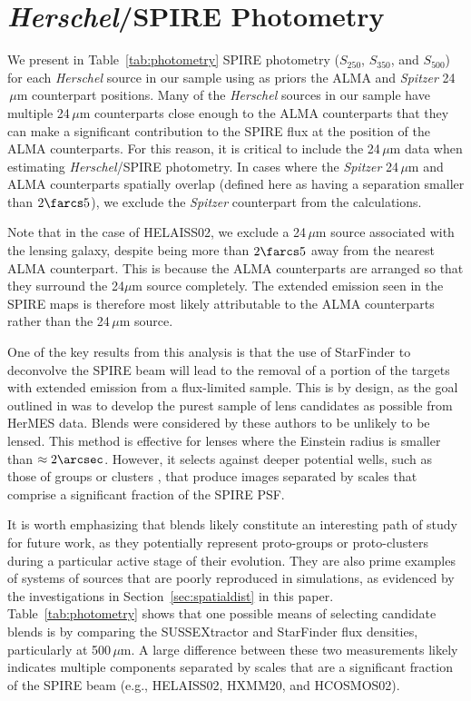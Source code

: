 \documentclass[iop]{emulateapj}
\begin{document}




\appendix

\section{{\it Herschel}/SPIRE Photometry}\label{sec:photometry}

We present in Table~\ref{tab:photometry} SPIRE photometry ($S_{250}$,
$S_{350}$, and $S_{500}$) for each {\it Herschel} source in our sample using as
priors the ALMA and {\it Spitzer} 24$\,\mu$m counterpart positions.  Many of
the {\it Herschel} sources in our sample have multiple 24$\,\mu$m counterparts
close enough to the ALMA counterparts that they can make a significant
contribution to the SPIRE flux at the position of the ALMA counterparts.  For
this reason, it is critical to include the 24$\,\mu$m data when estimating {\it
Herschel}/SPIRE photometry.  In cases where the {\it Spitzer} 24$\,\mu$m and
ALMA counterparts spatially overlap (defined here as having a separation
smaller than $2\farcs5$), we exclude the {\it Spitzer} counterpart from the
calculations.  

Note that in the case of HELAISS02, we exclude a 24$\,\mu$m source associated
with the lensing galaxy, despite being more than $2\farcs5$ away from the
nearest ALMA counterpart.  This is because the ALMA counterparts are arranged
so that they surround the 24$\mu$m source completely.  The extended emission
seen in the SPIRE maps is therefore most likely attributable to the ALMA
counterparts rather than the 24$\,\mu$m source.

One of the key results from this analysis is that the use of StarFinder to
deconvolve the SPIRE beam will lead to the removal of a portion of the targets
with extended emission from a flux-limited sample.  This is by design, as the
goal outlined in \citet{Wardlow:2013lr} was to develop the purest sample of
lens candidates as possible from HerMES data.  Blends were considered by these
authors to be unlikely to be lensed.  This method is effective for lenses where
the Einstein radius is smaller than $\approx 2\arcsec$.  However, it selects
against deeper potential wells, such as those of groups or clusters
\citep[e.g., HLock01][]{Gavazzi:2011lr}, that produce images separated by
scales that comprise a significant fraction of the SPIRE PSF.

It is worth emphasizing that blends likely constitute an interesting path of
study for future work, as they potentially represent proto-groups or
proto-clusters during a particular active stage of their evolution.  They are
also prime examples of systems of sources that are poorly reproduced in
simulations, as evidenced by the investigations in
Section~\ref{sec:spatialdist} in this paper.  Table~\ref{tab:photometry} shows
that one possible means of selecting candidate blends is by comparing the
SUSSEXtractor and StarFinder flux densities, particularly at 500$\,\mu$m.  A
large difference between these two measurements likely indicates multiple
components separated by scales that are a significant fraction of the SPIRE
beam (e.g., HELAISS02, HXMM20, and HCOSMOS02).


\end{document}
